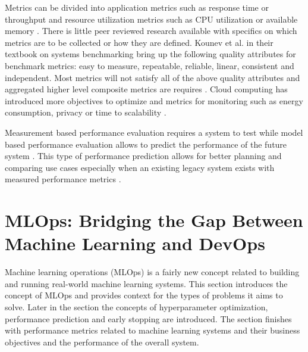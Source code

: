 Metrics can be divided into application metrics such as response time or throughput and resource utilization metrics such as CPU utilization or available memory \parencite{brunnertPerformanceorientedDevOpsResearch2015}. There is little peer reviewed research available with specifics on which metrics are to be collected or how they are defined. Kounev et al. \parencite*{kounevSystemsBenchmarkingScientists2020} in their textbook on systems benchmarking bring up the following quality attributes for benchmark metrics: easy to measure, repeatable, reliable, linear, consistent and independent. Most metrics will not satisfy all of the above quality attributes and aggregated higher level composite metrics are requires \parencite{kounevSystemsBenchmarkingScientists2020}. Cloud computing has introduced more objectives to optimize and metrics for monitoring such as energy consumption, privacy or time to scalability \parencite{aslanpourPerformanceEvaluationMetrics2020}.  

Measurement based performance evaluation requires a system to test while model based performance evaluation allows to predict the performance of the future system \parencite{brunnertPerformanceorientedDevOpsResearch2015}. This type of performance prediction allows for better planning and comparing use cases especially when an existing legacy system exists with measured performance metrics \parencite{brunnertPerformanceorientedDevOpsResearch2015}.


\section{MLOps: Bridging the Gap Between Machine Learning and DevOps}
\label{sec:mldevops}

Machine learning operations (MLOps) is a fairly new concept related to building and running real-world machine learning systems. This section introduces the concept of MLOps and provides context for the types of problems it aims to solve. Later in the section the concepts of hyperparameter optimization, performance prediction and early stopping are introduced. The section finishes with performance metrics related to machine learning systems and their business objectives and the performance of the overall system.

